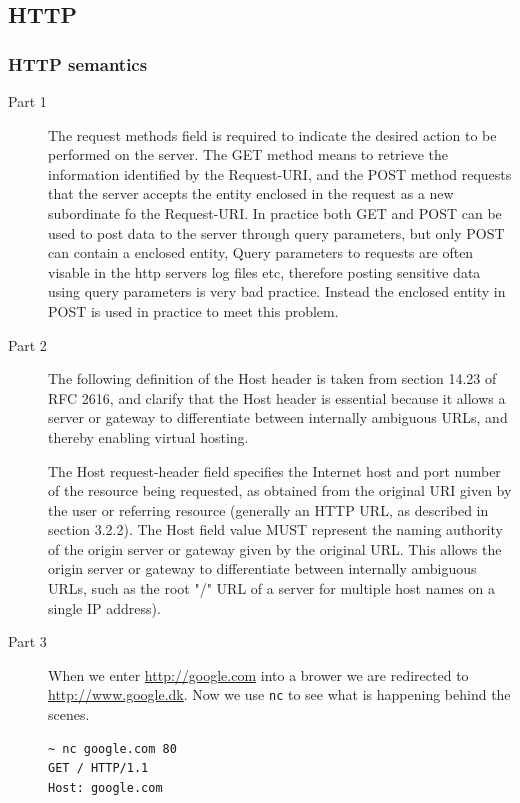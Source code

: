 \documentclass[a4paper]{article}
\begin{document}
\subsection{HTTP}
\subsubsection{HTTP semantics}
\begin{description}
    \item[Part 1] The request methods field is required to indicate the desired
        action to be performed on the server. The GET method means to retrieve
        the information identified by the Request-URI, and the POST method
        requests that the server accepts the entity enclosed in the request as
        a new subordinate fo the Request-URI. In practice both GET and POST can
        be used to post data to the server through query parameters, but only
        POST can contain a enclosed entity, Query parameters to requests are
        often visable in the http servers log files etc, therefore posting
        sensitive data using query parameters is very bad practice. Instead the
        enclosed entity in POST is used in practice to meet this problem.

    \item[Part 2] The following definition of the Host header is taken from
        section 14.23 of RFC 2616, and clarify that the Host header is
        essential because it allows a server or gateway to differentiate
        between internally ambiguous URLs, and thereby enabling virtual
        hosting.

        The Host request-header field specifies the Internet host and port
        number of the resource being requested, as obtained from the original
        URI given by the user or referring resource (generally an HTTP URL, as
        described in section 3.2.2). The Host field value MUST represent the
        naming authority of the origin server or gateway given by the original
        URL. This allows the origin server or gateway to differentiate between
        internally ambiguous URLs, such as the root "/" URL of a server for
        multiple host names on a single IP address).

    \item[Part 3] When we enter \url{http://google.com} into a brower we are
        redirected to \url{http://www.google.dk}. Now we use \texttt{nc} to see
        what is happening behind the scenes.

\begin{lstlisting}
~ nc google.com 80                                                                    
GET / HTTP/1.1
Host: google.com


\end{lstlisting}
\end{description}
\end{document}
